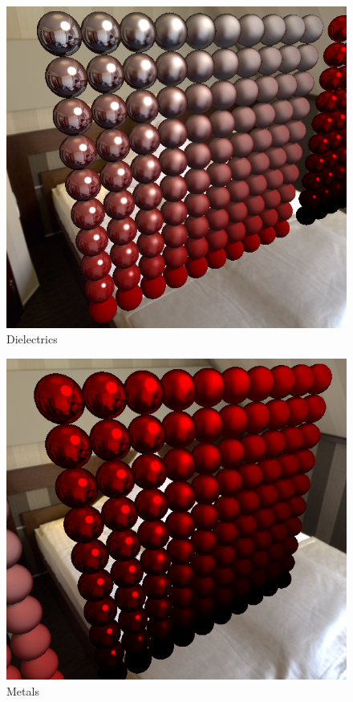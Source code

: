 \begin{figure}[h]
    \centering
    \includegraphics[scale=0.4,clip=true]{./image/pbr_dielectrics.png}
    \caption{Dielectrics}
\label{fig:pbrdielectrics}
\end{figure}

\begin{figure}[h]
    \centering
    \includegraphics[scale=0.4,clip=true]{./image/pbr_metals.png}
    \caption{Metals}
\label{fig:pbrmetals}
\end{figure}
